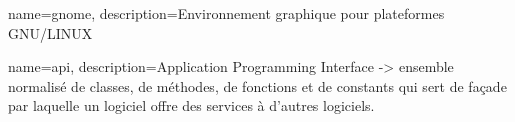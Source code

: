 {
    name=gnome,
    description={Environnement graphique pour plateformes GNU/LINUX}
}

{
	name=api,
	description={Application Programming Interface -> ensemble normalisé de classes, de méthodes, de fonctions et de constants qui sert de façade par laquelle un logiciel offre des services à d'autres logiciels.}
}


